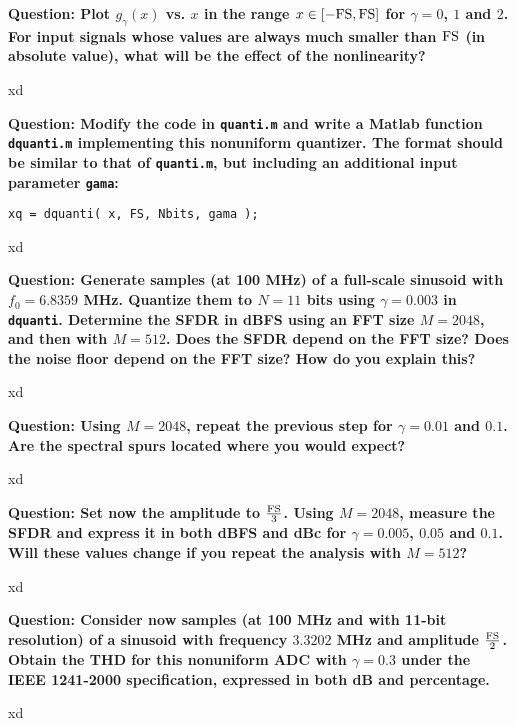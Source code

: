 \textbf{Question: Plot $g_\gamma(x)$ vs. $x$ in the range $x\in [-{\rm FS},{\rm FS}]$ for $\gamma = 0$, $1$ and $2$. For input signals whose values are always much smaller than $\rm FS$ (in absolute value), what will be the effect of the nonlinearity?
}
\vspace{0.5cm}

xd

\vspace{1cm}
\textbf{Question: Modify the code in {\tt quanti.m} and write a Matlab function {\tt dquanti.m} implementing this nonuniform quantizer. The format should be similar to that of {\tt quanti.m}, but including an additional input parameter {\tt gama}:}
\begin{center}
{\tt xq = dquanti( x, FS, Nbits, gama ); }
\end{center} 
\vspace{0.5cm}

xd

\vspace{1cm}
\textbf{Question: Generate  samples (at 100 MHz) of a full-scale sinusoid with $f_0 = 6.8359$ MHz.
Quantize them to $N=11$ bits using $\gamma = 0.003$ in {\tt dquanti}. 
Determine the SFDR in dBFS using an FFT size $M=2048$, and then with $M=512$. 
Does the SFDR depend on the FFT size? Does the noise floor depend on the FFT size? How do you explain this?
}
\vspace{0.5cm}

xd

\vspace{1cm}
\textbf{Question: Using $M=2048$, repeat the previous step for $\gamma = 0.01$ and $0.1$. Are the spectral spurs located where you would expect?
}
\vspace{0.5cm}

xd

\vspace{1cm}
\textbf{Question: Set now the amplitude to $\frac{\rm FS}{3}$. Using $M=2048$, measure the SFDR and express it in both dBFS and dBc for $\gamma=0.005$, $0.05$ and $0.1$. Will these values change if you repeat the analysis with $M=512$?
}
\vspace{0.5cm}

xd

\vspace{1cm}
\textbf{Question: Consider now samples (at 100 MHz and with 11-bit resolution) of a sinusoid with frequency $3.3202$ MHz and amplitude $\frac{\rm FS}{2}$. Obtain the THD for this nonuniform ADC with $\gamma = 0.3$ under the IEEE 1241-2000 specification, expressed in both dB and percentage.
}
\vspace{0.5cm}

xd

